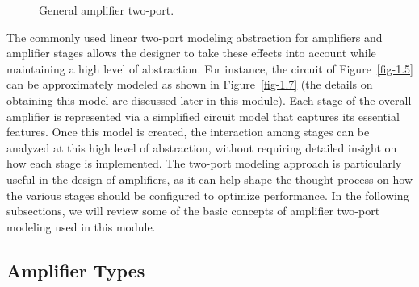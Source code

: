 \documentclass[
  11pt,
  letterpaper,
  abstract]{scrbook}
\begin{document}
\begin{figure}


\caption{\label{fig-1.8}General amplifier two-port.}

\end{figure}%

The commonly used linear two-port modeling abstraction for amplifiers
and amplifier stages allows the designer to take these effects into
account while maintaining a high level of abstraction. For instance, the
circuit of Figure~\ref{fig-1.5} can be approximately modeled as shown in
Figure~\ref{fig-1.7} (the details on obtaining this model are discussed
later in this module). Each stage of the overall amplifier is
represented via a simplified circuit model that captures its essential
features. Once this model is created, the interaction among stages can
be analyzed at this high level of abstraction, without requiring
detailed insight on how each stage is implemented. The two-port modeling
approach is particularly useful in the design of amplifiers, as it can
help shape the thought process on how the various stages should be
configured to optimize performance. In the following subsections, we
will review some of the basic concepts of amplifier two-port modeling
used in this module.

\subsection{Amplifier Types}\label{amplifier-types}
\end{document}
